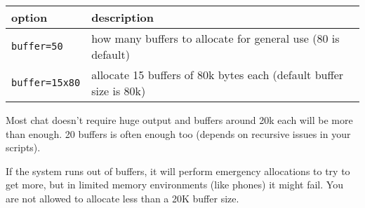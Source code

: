 \documentclass[]{article}
\begin{document}
\begin{longtable}[]{@{}ll@{}}
\toprule
\begin{minipage}[b]{0.16\columnwidth}\raggedright\strut
option\strut
\end{minipage} & \begin{minipage}[b]{0.78\columnwidth}\raggedright\strut
description\strut
\end{minipage}\tabularnewline
\midrule
\endhead
\begin{minipage}[t]{0.16\columnwidth}\raggedright\strut
\texttt{buffer=50}\strut
\end{minipage} & \begin{minipage}[t]{0.78\columnwidth}\raggedright\strut
how many buffers to allocate for general use (80 is default)\strut
\end{minipage}\tabularnewline
\begin{minipage}[t]{0.16\columnwidth}\raggedright\strut
\texttt{buffer=15x80}\strut
\end{minipage} & \begin{minipage}[t]{0.78\columnwidth}\raggedright\strut
allocate 15 buffers of 80k bytes each (default buffer size is 80k)\strut
\end{minipage}\tabularnewline
\bottomrule
\end{longtable}

Most chat doesn't require huge output and buffers around 20k each will
be more than enough. 20 buffers is often enough too (depends on
recursive issues in your scripts).

If the system runs out of buffers, it will perform emergency allocations
to try to get more, but in limited memory environments (like phones) it
might fail. You are not allowed to allocate less than a 20K buffer size.
\end{document}
